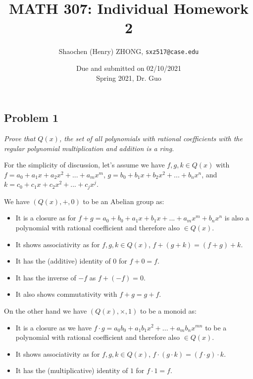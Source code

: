\documentclass[11pt]{article}
\newcommand{\ilc}{\texttt}
\begin{document}
\title{\textbf{MATH 307: Individual Homework 2}}


\author{
Shaochen (Henry) ZHONG, \ilc{sxz517@case.edu}}

\date{Due and submitted on 02/10/2021 \\ Spring 2021, Dr. Guo}
\maketitle




\subsection*{Problem 1}
\textit{Prove that $Q(x)$, the set of all polynomials with rational coefficients with the regular polynomial multiplication and addition is a ring.}\newline

\noindent For the simplicity of discussion, let's assume we have $f, g, k \in Q(x)$ with $f = a_0 + a_1 x + a_2 x^2 + ... + a_m x^m$, $g = b_0 + b_1 x + b_2 x^2 + ... + b_n x^n$, and $k = c_0 + c_1 x + c_2 x^2 + ... + c_j x^j$.

\noindent We have $(Q(x), +, 0)$ to be an Abelian group as:
\begin{itemize}
    \item It is a closure as for $f + g = a_0 + b_0 + a_1 x + b_1 x + ... + a_m x^m + b_n x^n$ is also a polynomial with rational coefficient and therefore also $\in Q(x)$.
    \item It shows associativity as for $f, g, k \in Q(x)$, $f + (g + k) = (f + g) + k$.
    \item It has the (additive) identity of $0$ for $f + 0 = f$.
    \item It has the inverse of $-f$ as $f + (-f) = 0$.
    \item It also shows commutativity with $f + g = g + f$.
\end{itemize}


\noindent On the other hand we have $(Q(x), \times, 1)$ to be a monoid as:

\begin{itemize}
    \item It is a closure as we have $f \cdot g = a_0 b_0 + a_1 b_1 x^2 + ... + a_m b_n x^{mn}$ to be a polynomial with rational coefficient and therefore also $\in Q(x)$.
    \item It shows associativity as for $f, g, k \in Q(x)$, $f \cdot (g \cdot k) = (f \cdot g) \cdot k$.
    \item It has the (multiplicative) identity of $1$ for $f \cdot 1 = f$.
\end{itemize}
\end{document}
